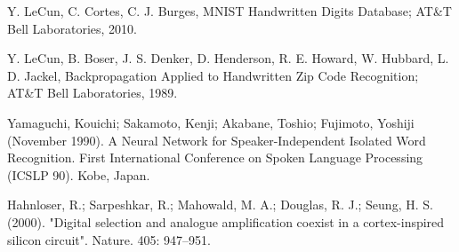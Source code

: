 \documentclass[transmag]{IEEEtran}
\begin{document}
\begin{thebibliography}{00}

 Y. LeCun, C. Cortes, C. J. Burges, MNIST Handwritten Digits 
    Database; AT\&T Bell Laboratories, 2010.

 Y. LeCun, B. Boser, J. S. Denker, D. Henderson, R. E. Howard, 
    W. Hubbard, L. D. Jackel, Backpropagation Applied to Handwritten Zip Code 
    Recognition; AT\&T Bell Laboratories, 1989.

 Yamaguchi, Kouichi; Sakamoto, Kenji; Akabane, Toshio; Fujimoto, 
    Yoshiji (November 1990). A Neural Network for Speaker-Independent Isolated 
    Word Recognition. First International Conference on Spoken Language 
    Processing (ICSLP 90). Kobe, Japan.

 Hahnloser, R.; Sarpeshkar, R.; Mahowald, M. A.; Douglas, 
    R. J.; Seung, H. S. (2000). "Digital selection and analogue amplification 
    coexist in a cortex-inspired silicon circuit". Nature. 405: 947–951.



\end{thebibliography}
\end{document}
